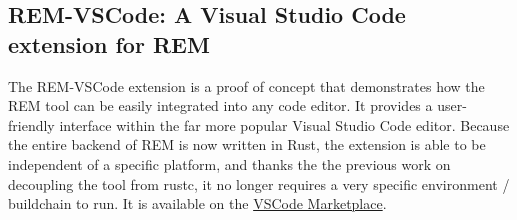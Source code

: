 \subsection*{REM-VSCode: A Visual Studio Code extension for REM}

The REM-VSCode extension is a proof of concept that demonstrates how the REM
tool can be easily integrated into any code editor. It provides a user-friendly interface
within the far more popular Visual Studio Code editor. Because the entire
backend of REM is now written in Rust, the extension is able to be independent
of a specific platform, and thanks the the previous work on decoupling the tool
from rustc, it no longer requires a very specific environment / buildchain to
run. It is available on the \href{https://marketplace.visualstudio.com/items?itemName=MatthewBritton.remvscode&ssr=false#overview}{VSCode Marketplace}.